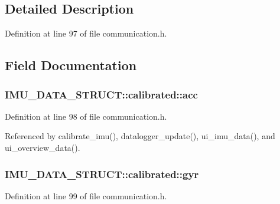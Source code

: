 \subsection{Detailed Description}


Definition at line 97 of file communication.\-h.



\subsection{Field Documentation}
\hypertarget{structIMU__DATA__STRUCT_1_1calibrated_a281a7fdb40a05ed97388f18b9bb90c81}{
\subsubsection[{acc}]{ I\-M\-U\-\_\-\-D\-A\-T\-A\-\_\-\-S\-T\-R\-U\-C\-T\-::calibrated\-::acc}}\label{structIMU__DATA__STRUCT_1_1calibrated_a281a7fdb40a05ed97388f18b9bb90c81}


Definition at line 98 of file communication.\-h.



Referenced by calibrate\-\_\-imu(), datalogger\-\_\-update(), ui\-\_\-imu\-\_\-data(), and ui\-\_\-overview\-\_\-data().

\hypertarget{structIMU__DATA__STRUCT_1_1calibrated_a8a54aded6ce608f1b7d2b4a0c52c248b}{
\subsubsection[{gyr}]{ I\-M\-U\-\_\-\-D\-A\-T\-A\-\_\-\-S\-T\-R\-U\-C\-T\-::calibrated\-::gyr}}\label{structIMU__DATA__STRUCT_1_1calibrated_a8a54aded6ce608f1b7d2b4a0c52c248b}


Definition at line 99 of file communication.\-h.



